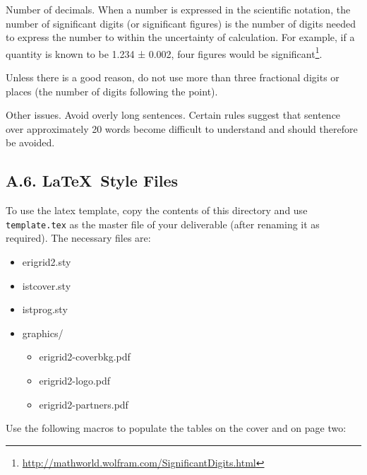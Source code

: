 Number of decimals. When a number is expressed in the scientific notation, the number of significant digits (or significant figures) is the number of digits needed to express the number to within the uncertainty of calculation. For example, if a quantity is known to be 1.234 ± 0.002, four figures would be significant\footnote{\url{http://mathworld.wolfram.com/SignificantDigits.html}}.

Unless there is a good reason, do not use more than three fractional digits or places (the number of digits following the point).

Other issues. Avoid overly long sentences. Certain rules suggest that sentence over approximately 20 words become difficult to understand and should therefore be avoided. 

\subsection*{A.6. \LaTeX\ Style Files}
\label{sec:appendix-a6-latex-style-files}

\newcommand{\macro}[1]{{\tt \textbackslash #1}}

To use the latex template, copy the contents of this directory and use {\tt template.tex} as the master file of your deliverable (after renaming it as required). The necessary files are:

\begin{itemize}
    \item erigrid2.sty
    \item istcover.sty
    \item istprog.sty
    \item graphics/
    \begin{itemize}
        \item erigrid2-coverbkg.pdf
        \item erigrid2-logo.pdf
        \item erigrid2-partners.pdf
    \end{itemize}
\end{itemize}

Use the following macros to populate the tables on the cover and on page two:

